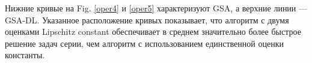 \documentclass[runningheads]{llncs}
\begin{document}
Нижние кривые на Fig. \ref{oper4} и \ref{oper5} характеризуют GSA, а верхние линии — GSA-DL. Указанное расположение кривых показывает, что алгоритм с двумя оценками Lipschitz constant обеспечивает в среднем значительно более быстрое решение задач серии, чем алгоритм с использованием единственной оценки константы.

%
%




\end{document}
